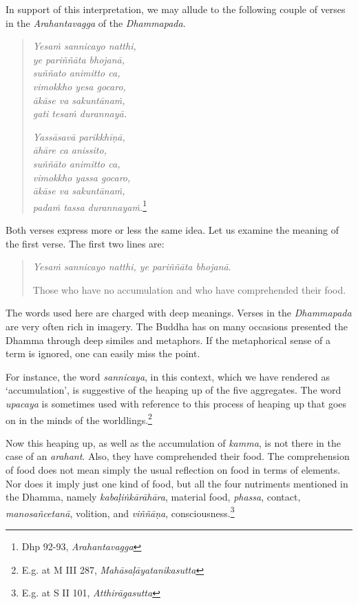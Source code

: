 In support of this interpretation, we may allude to the following couple of verses in the \emph{Arahantavagga} of the \emph{Dhammapada}.

\begin{quote}
\emph{Yesaṁ sannicayo natthi,}\\
\emph{ye pariññāta bhojanā,}\\
\emph{suññato animitto ca,}\\
\emph{vimokkho yesa gocaro,}\\
\emph{ākāse va sakuntānaṁ,}\\
\emph{gati tesaṁ durannayā.}

\emph{Yassāsavā parikkhīṇā,}\\
\emph{āhāre ca anissito,}\\
\emph{suññāto animitto ca,}\\
\emph{vimokkho yassa gocaro,}\\
\emph{ākāse va sakuntānaṁ,}\\
\emph{padaṁ tassa durannayaṁ.}\footnote{Dhp 92-93, \emph{Arahantavagga}}
\end{quote}

Both verses express more or less the same idea. Let us examine the meaning of the first verse. The first two lines are:

\begin{quote}
\emph{Yesaṁ sannicayo natthi, ye pariññāta bhojanā}.

Those who have no accumulation and who have comprehended their food.
\end{quote}

The words used here are charged with deep meanings. Verses in the \emph{Dhammapada} are very often rich in imagery. The Buddha has on many occasions presented the Dhamma through deep similes and metaphors. If the metaphorical sense of a term is ignored, one can easily miss the point.

For instance, the word \emph{sannicaya}, in this context, which we have rendered as `accumulation', is suggestive of the heaping up of the five aggregates. The word \emph{upacaya} is sometimes used with reference to this process of heaping up that goes on in the minds of the worldlings.\footnote{E.g. at M III 287, \emph{Mahāsaḷāyatanikasutta}}

Now this heaping up, as well as the accumulation of \emph{kamma}, is not there in the case of an \emph{arahant}. Also, they have comprehended their food. The comprehension of food does not mean simply the usual reflection on food in terms of elements. Nor does it imply just one kind of food, but all the four nutriments mentioned in the Dhamma, namely \emph{kabaḷiṅkārāhāra}, material food, \emph{phassa}, contact, \emph{manosañcetanā}, volition, and \emph{viññāṇa}, consciousness.\footnote{E.g. at S II 101, \emph{Atthirāgasutta}}

